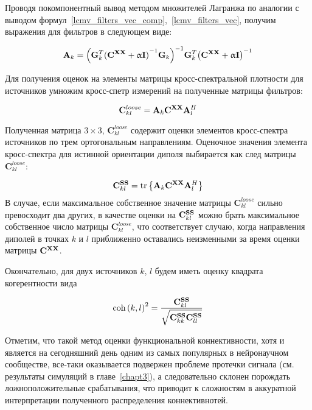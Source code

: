 Проводя покомпонентный вывод методом множителей Лагранжа по аналогии с
выводом формул~\ref{lcmv_filters_vec_comp},~\ref{lcmv_filters_vec}, получим
выражения для фильтров в следующем виде:

\begin{equation}
    \mathbf{A}_k =
    {\left(\mathbf{G}_k^T {(\mathbf{C}^{\mathbf{X X}} + \upalpha \mathbf{I})}^{-1} \mathbf{G}_k\right)}^{-1}
    \mathbf{G}_k^T {\left(\mathbf{C}^{\mathbf{X X}} + \upalpha \mathbf{I}\right)}^{-1}
\end{equation}

Для получения оценок на элементы матрицы кросс-спектральной плотности для источников
умножим кросс-спетр измерений на полученные матрицы фильтров:

\begin{equation}
    \mathbf{C}^{loose}_{kl} = \mathbf{A}_k \mathbf{C}^{\mathbf{X X}} \mathbf{A}_l^H
    \label{eq:dics_c_loose}
\end{equation}

Полученная матрица $3\times 3$, $\mathbf{C}^{loose}_{kl}$
содержит оценки элементов кросс-спектра источников по трем ортогональным направлениям.
Оценочное значения элемента кросс-спектра для истинной ориентации диполя
выбирается как след матрицы $\mathbf{C}^{loose}_{kl}$:

\begin{equation}
    \mathbf{C}^{\mathbf{S S}}_{kl} = \operatorname{tr}\left\{\mathbf{A}_k \mathbf{C}^{\mathbf{X X}} \mathbf{A}_l^H\right\}
\end{equation}
В случае, если максимальное собственное значение матрицы $\mathbf{C}^{loose}_{kl}$
сильно превосходит два других, в качестве оценки на $\mathbf{C}^{\mathbf{S S}}_{kl}$ можно брать
максимальное собственное число матрицы $\mathbf{C}^{loose}_{kl}$, что соответствует
случаю, когда направления диполей в точках $k$ и $l$ приближенно оставались неизменными
за время оценки матрицы $\mathbf{C}^{\mathbf{X X}}$.

Окончательно, для двух источников $k$, $l$ будем иметь оценку квадрата когерентности вида

\begin{equation}
    \operatorname{coh}{(k, l)}^2 = \frac{\mathbf{C}^{\mathbf{S S}}_{kl}}{\sqrt{\mathbf{C}^{\mathbf{S S}}_{kk} \mathbf{C}^{\mathbf{S S}}_{ll}}}
\end{equation}

Отметим, что такой метод оценки функциональной коннективности, хотя и является
на сегодняшний день одним из самых популярных в нейронаучном сообществе,
все-таки оказывается подвержен проблеме протечки сигнала (см. результаты
симуляций в главе~\ref{chapt3}), а следовательно склонен порождать
ложноположительные срабатывания, что приводит к сложностям в аккуратной
интерпретации полученного распределения коннективнотей.

